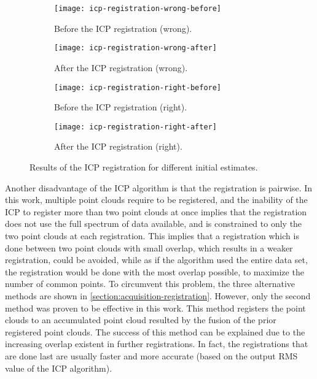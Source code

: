 \begin{figure}[h]
    
    \centering
    \begin{subfigure}[t]{0.5\textwidth}
        \texttt{[image: icp-registration-wrong-before]}
        \caption{Before the ICP registration (wrong).}
        \label{figure:icp-registration-wrong-before}
    \end{subfigure}%
    \begin{subfigure}[t]{0.5\textwidth}
        \texttt{[image: icp-registration-wrong-after]}
        \caption{After the ICP registration (wrong).}
        \label{figure:icp-registration-wrong-after}
    \end{subfigure}

    \begin{subfigure}[t]{0.5\textwidth}
        \texttt{[image: icp-registration-right-before]}
        \caption{Before the ICP registration (right).}
        \label{figure:icp-registration-right-before}
    \end{subfigure}%
    \begin{subfigure}[t]{0.5\textwidth}
        \texttt{[image: icp-registration-right-after]}
        \caption{After the ICP registration (right).}
        \label{figure:icp-registration-right-after}
    \end{subfigure}

    \caption{Results of the ICP registration for different initial estimates.}
    \label{figure:icp-results}

\end{figure}

Another disadvantage of the ICP algorithm is that the registration is pairwise. In this work, multiple point clouds require to be registered, and the inability of the ICP to register more than two point clouds at once implies that the registration does not use the full spectrum of data available, and is constrained to only the two point clouds at each registration. This implies that a registration which is done between two point clouds with small overlap, which results in a weaker registration, could be avoided, while as if the algorithm used the entire data set, the registration would be done with the most overlap possible, to maximize the number of common points. To circumvent this problem, the three alternative methods are shown in \cref{section:acquisition-registration}. However, only the second method was proven to be effective in this work. This method registers the point clouds to an accumulated point cloud resulted by the fusion of the prior registered point clouds. The success of this method can be explained due to the increasing overlap existent in further registrations. In fact, the registrations that are done last are usually faster and more accurate (based on the output RMS value of the ICP algorithm).

